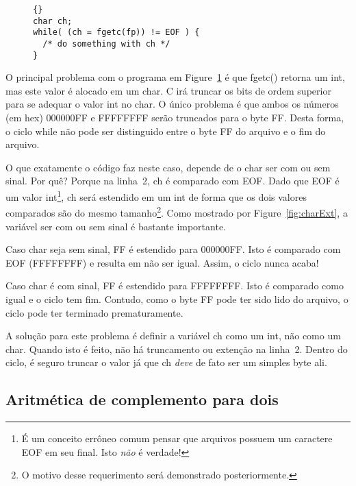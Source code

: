 \begin{figure}[t]
\begin{lstlisting}[stepnumber=0,frame=tlrb]{}
char ch;
while( (ch = fgetc(fp)) != EOF ) {
  /* do something with ch */
}
\end{lstlisting}
\caption{}
\label{fig:IObug}
\end{figure}

O principal problema com o programa em Figure~\ref{fig:IObug} é que
{\code fgetc()} retorna um {\code int}, mas este valor é alocado em um
{\code char}. C irá truncar os bits de ordem superior para se adequar o valor {\code
int} no {\code char}. O único problema é que ambos os números
(em hex) {\code 000000FF} e {\code FFFFFFFF} serão truncados
para o byte {\code FF}. Desta forma, o ciclo while não pode ser distinguido 
entre o byte {\code FF} do arquivo e o fim do arquivo.

O que exatamente o código faz neste caso, depende de o {\code char} ser
com ou sem sinal. Por quê? Porque na linha~2, {\code ch} é comparado com 
{\code EOF}. Dado que {\code EOF} é um valor {\code int}\footnote{É um
conceito errôneo comum pensar que arquivos possuem um caractere EOF em seu final. Isto
\emph{não} é verdade!}, {\code ch} será
estendido em um {\code int} de forma que os dois valores comparados são do 
mesmo tamanho\footnote{O motivo desse requerimento será demonstrado posteriormente.}.
Como mostrado por Figure~\ref{fig:charExt}, a variável ser com ou sem sinal 
é bastante importante.

Caso {\code char} seja sem sinal, {\code FF} é estendido para {\code
000000FF}. Isto é comparado com {\code EOF} ({\code FFFFFFFF}) e
resulta em não ser igual. Assim, o ciclo nunca acaba!

Caso {\code char} é com sinal, {\code FF} é estendido para {\code
FFFFFFFF}. Isto é comparado como igual e o ciclo tem fim. Contudo,
como o byte {\code FF} pode ter sido lido do arquivo, o ciclo 
pode ter terminado prematuramente.

A solução para este problema é definir a variável {\code ch} como um
{\code int}, não como um {\code char}. Quando isto é feito, não há truncamento ou
extenção na linha~2. Dentro do ciclo, é seguro truncar o
valor já que {\code ch} \emph{deve} de fato ser um simples byte ali.


\subsection{Aritmética de complemento para dois }

